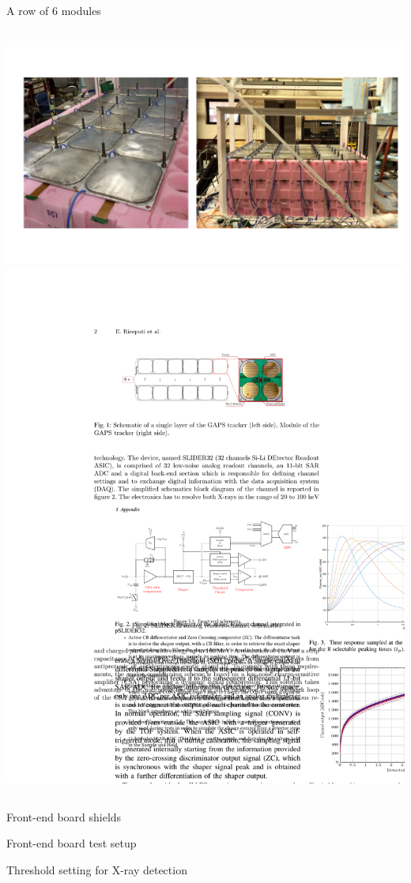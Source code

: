 \documentclass[aspectratio=169,xcolor=dvipsnames,handout]{beamer} %
\newcommand{\backupend}{
   \setcounter{framenumber}{\value{finalframe}}
}
\begin{document}
\begin{frame}{A row of 6 modules}
\begin{columns}
            \centering
            \includegraphics[width=1\textwidth]{images/backup_slides/row_feb_coppia.pdf}
            \vskip0.2cm
            \includegraphics[width=1\textwidth]{images/backup_slides/row_scheme_elisa.pdf}   
    \end{columns}
\end{frame}

\begin{frame}{Front-end board shields}
    
\end{frame}

\begin{frame}{Front-end board test setup}
    
\end{frame}

\begin{frame}{Threshold setting for X-ray detection}
    
\end{frame}

\backupend
\end{document}
